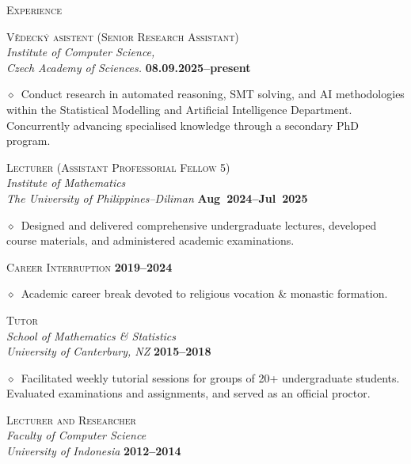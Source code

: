 \documentclass[11pt, a4paper]{article}
\newcommand{\dates}[1]{\hfill\mbox{\textbf{#1}}} %
\newcommand{\is}{\par\vskip.5ex plus .4ex} %
\newcommand{\smaller}[1]{{\small$\diamond$\ #1}}
\newcommand{\headright}[1]{\vspace*{2.5ex}\textsc{\Large\color{cvblue}#1}\par%
     \vspace*{-2ex}{\color{cvblue}\hrulefill}\par}
\begin{document}
\begin{minipage}[t]{0.56\textwidth}
\setlength{\parskip}{0.8ex}%

\vspace{2ex}

\headright{Experience}

\textsc{Vědecký asistent (Senior Research Assistant)}\\ \textit{Institute of Computer Science,\\Czech Academy of Sciences.}  \dates{08.09.2025--present} 

\smaller{Conduct research in automated reasoning, SMT solving, and AI methodologies within the Statistical Modelling and Artificial Intelligence Department. Concurrently advancing specialised knowledge through a secondary PhD program.}


\medskip
\textsc{Lecturer (Assistant Professorial Fellow 5)}\\ \textit{Institute of Mathematics\\The University of Philippines--Diliman}  \dates{Aug 2024--Jul 2025}

\smaller{Designed and delivered comprehensive undergraduate lectures, developed course materials, and administered academic examinations.}

\medskip
\textsc{Career Interruption}  \dates{2019--2024}

\smaller{Academic career break devoted to religious vocation \& monastic formation.}

\medskip
\textsc{Tutor}\\ \textit{School of Mathematics \& Statistics\\ University of Canterbury, NZ}  \dates{2015--2018}

\smaller{Facilitated weekly tutorial sessions for groups of 20+ undergraduate students. Evaluated examinations and assignments, and served as an official proctor.}

\medskip
\textsc{Lecturer and Researcher}\\ \textit{Faculty of Computer Science\\University of Indonesia}  \dates{2012--2014}


\end{minipage}
\end{document}
